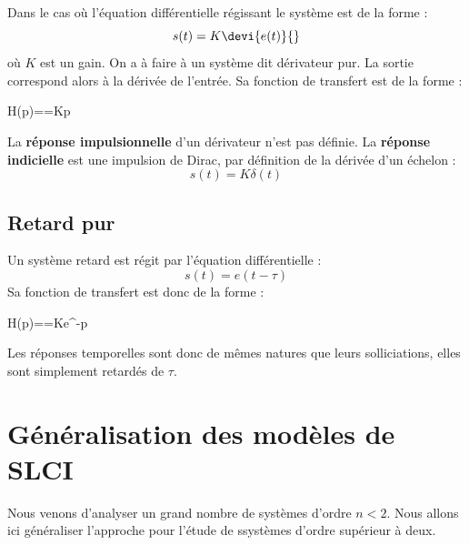 Dans le cas où l'équation différentielle régissant le système est de la forme :
$$
s(t)=K\devi{e(t)}{}
$$
où $K$ est un gain. On a à faire à un système dit dérivateur pur. 
La sortie correspond alors à la dérivée de l'entrée.
Sa fonction de transfert est de la forme :
\begin{bequation}
H(p)==Kp
\end{bequation}

La \textbf{réponse impulsionnelle} d'un dérivateur n'est pas définie. 
La \textbf{réponse indicielle} est une impulsion de Dirac, par 
définition de la dérivée d'un échelon :
$$
s(t)=K\delta(t)
$$



\subsection{Retard pur}


Un système retard est régit par l'équation différentielle :
$$
s(t)=e(t-\tau)
$$
Sa fonction de transfert est donc de la forme :
\begin{bequation}
H(p)==Ke^{-\tau p}
\end{bequation}
Les réponses temporelles sont donc de mêmes natures que leurs solliciations, 
elles sont simplement retardés de $\tau$.

\newpage

\section{Généralisation des modèles de SLCI}

Nous venons d'analyser un grand nombre de systèmes d'ordre $n<2$. 
Nous allons ici généraliser l'approche pour l'étude de ssystèmes d'ordre 
supérieur à deux.


